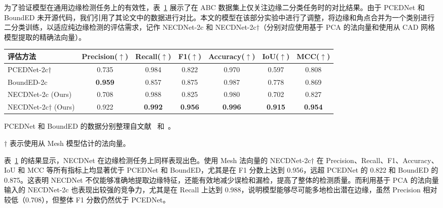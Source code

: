 为了验证模型在通用边缘检测任务上的有效性，表~\ref{tab:edge_result} 展示了在 ABC 数据集上仅关注边缘二分类任务时的对比结果。由于 PCEDNet 和 BoundED 未开源代码，我们引用了其论文中的数据进行对比。本文的模型在该部分实验中进行了调整，将边缘和角点合并为一个类别进行二分类训练，以适应纯边缘检测的评估需求，记作 NECDNet-2c 和 NECDNet-2c$\dagger$（分别对应使用基于 PCA 的法向量和使用从 CAD 网格模型提取的精确法向量）。
\begin{table}[ht]
    \centering
    \small
    \begin{threeparttable}
    \setlength{\tabcolsep}{7pt}
    \label{tab:edge_result}
    \begin{tabular}{lcccccc}
        \toprule
        评估方法 & Precision($\uparrow$) & Recall($\uparrow$) & F1($\uparrow$) & Accuracy($\uparrow$) & IoU($\uparrow$) & MCC($\uparrow$) \\
        \midrule
        PCEDNet-2c$\dagger$~\cite{himeur_pcednet_2022} & 0.735 & 0.984 & 0.822 & 0.970 & 0.597 & 0.808 \\
        BoundED-2c~\cite{bode_bounded_2023} & \textbf{0.959} & 0.857 & 0.875 & 0.987 & 0.778 & 0.869 \\
        NECDNet-2c (Ours) & 0.708 & 0.988 & 0.825 & 0.980 & 0.702 & 0.827 \\
        NECDNet-2c$\dagger$ (Ours) & 0.922 & \textbf{0.992} & \textbf{0.956} & \textbf{0.996} & \textbf{0.915} & \textbf{0.954} \\
        \bottomrule
    \end{tabular}
    \begin{tablenotes}
        \footnotesize
         \item PCEDNet 和 BoundED 的数据分别整理自文献~\cite{himeur_pcednet_2022} 和~\cite{bode_bounded_2023}。
        
        \item $\dagger$ 表示使用从 Mesh 模型估计的法向量。 
     \end{tablenotes}
     \end{threeparttable}
    
\end{table}

表~\ref{tab:edge_result} 的结果显示，NECDNet 在边缘检测任务上同样表现出色。使用 Mesh 法向量的 NECDNet-2c$\dagger$ 在 Precision、Recall、F1、Accuracy、IoU 和 MCC 等所有指标上均显著优于 PCEDNet 和 BoundED，尤其是在 F1 分数上达到 0.956，远超 PCEDNet 的 0.822 和 BoundED 的 0.875。这表明 NECDNet 不仅能够准确地提取边缘特征，还能有效地减少误检和漏检，提高了整体的检测质量。而利用基于 PCA 的法向量输入的 NECDNet-2c 也表现出较强的竞争力，尤其是在 Recall 上达到 0.988，说明模型能够尽可能多地检出潜在边缘，虽然 Precision 相对较低（0.708），但整体 F1 分数仍然优于 PCEDNet。

